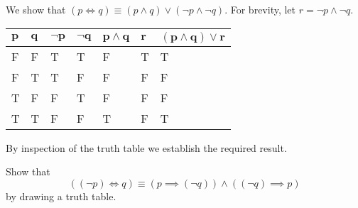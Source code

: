 \begin{example}
    We show that $(p \iff q) \equiv (p \land q) \lor (\lnot p \land \lnot q)$. For brevity, let $r = \lnot p \land \lnot q$.
    \begin{table}[h]
        \centering
        \begin{tabular}{|l|l||l|l|l|l||l|}
            \hline
            $\boldsymbol{p}$ & $\boldsymbol{q}$ & $\boldsymbol{\lnot p}$ & $\boldsymbol{\lnot q}$ & $\boldsymbol{p \land q}$ & $\boldsymbol{r}$ & $\boldsymbol{(p \land q) \lor r}$ \\ \hline
            F   & F   & T         & T         & F           & T   & T                    \\ \hline
            F   & T   & T         & F         & F           & F   & F                    \\ \hline
            T   & F   & F         & T         & F           & F   & F                    \\ \hline
            T   & T   & F         & F         & T           & F   & T                    \\ \hline
        \end{tabular}
    \end{table}

    By inspection of the truth table we establish the required result.
\end{example}

\begin{exercise}
    Show that
    \[
        ((\lnot p) \iff q) \equiv (p \implies (\lnot q)) \land ((\lnot q) \implies p)
    \]
    by drawing a truth table.
\end{exercise}

